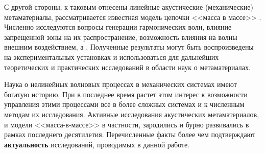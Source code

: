 С другой стороны, к таковым отнесены линейные акустические (механические) метаматериалы, рассматривается известная модель цепочки <<масса в массе>> \cite{Huang2009}. Численно исследуются вопросы генерации гармонических волн, влияние запрещенной зоны на их распространение, возможность влияния на волны внешним воздействием, а . Полученные результаты могут быть воспроизведены на экспериментальных установках и использоваться для дальнейших теоретических и практических исследований в области наук о метаматериалах.

{\actuality} Наука о нелинейных волновых процессах в механических системах имеют богатую историю. При в последнее время растет этом интерес к возможности управления этими процессами все в более сложных системах и к численным методам их исследования. Активные исследования акустических метаматериалов, и модели <<масса-в-массе>> в частности, зародились и бурно развивались в рамках последнего десятилетия. Перечисленные факты более чем подтверждают \textbf{актуальность} исследований, проводимых в данной работе.



